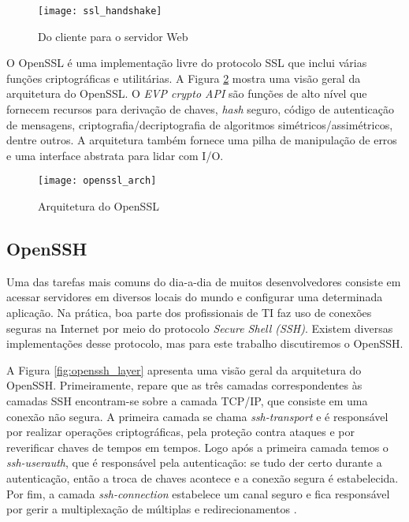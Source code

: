 \begin{figure}[!h]
  \centering
  \texttt{[image: ssl\_handshake]}
  \caption{Do cliente para o servidor Web}
  \label{fig:openssl_handshake}
\end{figure}

O OpenSSL é uma implementação livre do protocolo SSL que
inclui várias funções criptográficas e utilitárias. A Figura
\ref{fig:openssl_arch} mostra uma visão geral da arquitetura do OpenSSL. O
\textit{EVP crypto API} são funções de alto nível que fornecem recursos para
derivação de chaves, \textit{hash} seguro, código de autenticação de mensagens,
criptografia/decriptografia de algoritmos simétricos/assimétricos, dentre outros. A
arquitetura também fornece uma pilha de manipulação de erros e uma interface
abstrata para lidar com I/O.

\begin{figure}[!h]
  \centering
  \texttt{[image: openssl\_arch]}
  \caption[Arquitetura do OpenSSL]{Arquitetura do OpenSSL \citep{crypto_openssl}}
  \label{fig:openssl_arch}
\end{figure}


\subsection{OpenSSH}

Uma das tarefas mais comuns do dia-a-dia de muitos desenvolvedores consiste em
acessar servidores em diversos locais do mundo e configurar uma determinada
aplicação. Na prática, boa parte dos profissionais de TI faz uso de conexões
seguras na Internet por meio do protocolo \textit{Secure Shell (SSH)}. Existem
diversas implementações desse protocolo, mas para este trabalho discutiremos o
OpenSSH.

A Figura \ref{fig:openssh_layer} apresenta uma visão geral da arquitetura do
OpenSSH. Primeiramente, repare que as três camadas correspondentes às camadas
SSH encontram-se sobre a camada TCP/IP, que consiste em uma conexão não segura.
A primeira camada se chama \textit{ssh-transport} e é responsável por
realizar operações criptográficas, pela proteção contra ataques e por reverificar chaves
de tempos em tempos. Logo após a primeira camada temos o \textit{ssh-userauth},
que é responsável pela autenticação: se tudo der certo durante a autenticação,
então a troca de chaves acontece e a conexão segura é estabelecida. Por fim, a
camada \textit{ssh-connection} estabelece um canal seguro e fica responsável
por gerir a multiplexação de múltiplas  e redirecionamentos
\citep{proopenssh, opensshhood}.

